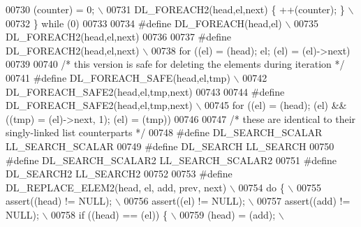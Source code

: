 \begin{DoxyCode}
00730 \textcolor{preprocessor}{  (counter) = 0;                                                                               \(\backslash\)}
00731 \textcolor{preprocessor}{  DL\_FOREACH2(head,el,next) \{ ++(counter); \}                                                   \(\backslash\)}
00732 \textcolor{preprocessor}{\} while (0)}
00733 
00734 \textcolor{preprocessor}{#define DL\_FOREACH(head,el)                                                                    \(\backslash\)}
00735 \textcolor{preprocessor}{    DL\_FOREACH2(head,el,next)}
00736 
00737 \textcolor{preprocessor}{#define DL\_FOREACH2(head,el,next)                                                              \(\backslash\)}
00738 \textcolor{preprocessor}{    for ((el) = (head); el; (el) = (el)->next)}
00739 
00740 \textcolor{comment}{/* this version is safe for deleting the elements during iteration */}
00741 \textcolor{preprocessor}{#define DL\_FOREACH\_SAFE(head,el,tmp)                                                           \(\backslash\)}
00742 \textcolor{preprocessor}{    DL\_FOREACH\_SAFE2(head,el,tmp,next)}
00743 
00744 \textcolor{preprocessor}{#define DL\_FOREACH\_SAFE2(head,el,tmp,next)                                                     \(\backslash\)}
00745 \textcolor{preprocessor}{  for ((el) = (head); (el) && ((tmp) = (el)->next, 1); (el) = (tmp))}
00746 
00747 \textcolor{comment}{/* these are identical to their singly-linked list counterparts */}
00748 \textcolor{preprocessor}{#define DL\_SEARCH\_SCALAR LL\_SEARCH\_SCALAR}
00749 \textcolor{preprocessor}{#define DL\_SEARCH LL\_SEARCH}
00750 \textcolor{preprocessor}{#define DL\_SEARCH\_SCALAR2 LL\_SEARCH\_SCALAR2}
00751 \textcolor{preprocessor}{#define DL\_SEARCH2 LL\_SEARCH2}
00752 
00753 \textcolor{preprocessor}{#define DL\_REPLACE\_ELEM2(head, el, add, prev, next)                                            \(\backslash\)}
00754 \textcolor{preprocessor}{do \{                                                                                           \(\backslash\)}
00755 \textcolor{preprocessor}{ assert((head) != NULL);                                                                       \(\backslash\)}
00756 \textcolor{preprocessor}{ assert((el) != NULL);                                                                         \(\backslash\)}
00757 \textcolor{preprocessor}{ assert((add) != NULL);                                                                        \(\backslash\)}
00758 \textcolor{preprocessor}{ if ((head) == (el)) \{                                                                         \(\backslash\)}
00759 \textcolor{preprocessor}{  (head) = (add);                                                                              \(\backslash\)}

\end{DoxyCode}
